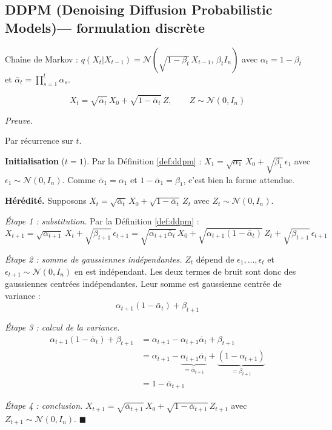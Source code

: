 \documentclass[12pt]{article}
\renewcommand{\qedsymbol}{$\blacksquare$}
\renewenvironment{proof}[1][\proofname]{%
  \par\medskip\noindent
  \textit{\color{proofgray}#1.}\enspace\ignorespaces
}{\hfill\qedsymbol\par\medskip}
\renewcommand{\proofname}{Preuve}
\begin{document}
\subsection{DDPM (Denoising Diffusion Probabilistic Models)--- formulation discrète}

\begin{definitionbox}
\label{def:ddpm}
Chaîne de Markov : $q(X_t | X_{t-1}) = \mathcal{N}(\sqrt{1-\beta_t}\, X_{t-1},\, \beta_t I_n)$ avec $\alpha_t = 1-\beta_t$ et $\bar\alpha_t = \prod_{s=1}^t \alpha_s$.
\end{definitionbox}

\begin{resultbox}
\label{res:ddpm}
\begin{equation}
    \boxed{X_t = \sqrt{\bar\alpha_t}\, X_0 + \sqrt{1-\bar\alpha_t}\, Z, \qquad Z \sim \mathcal{N}(0, I_n)}
    \label{eq:ddpm_marginal}
\end{equation}
\end{resultbox}

  \begin{proof}







Par récurrence sur $t$.

\textbf{Initialisation} ($t=1$). Par la Définition \ref{def:ddpm} : $X_1 = \sqrt{\alpha_1}\, X_0 + \sqrt{\beta_1}\, \epsilon_1$ avec $\epsilon_1 \sim \mathcal{N}(0, I_n)$. Comme $\bar\alpha_1 = \alpha_1$ et $1 - \bar\alpha_1 = \beta_1$, c'est bien la forme attendue.

\textbf{Hérédité.} Supposons $X_t = \sqrt{\bar\alpha_t}\, X_0 + \sqrt{1-\bar\alpha_t}\, Z_t$ avec $Z_t \sim \mathcal{N}(0, I_n)$.

\textit{Étape 1 : substitution.} Par la Définition \ref{def:ddpm} :
\[
X_{t+1} = \sqrt{\alpha_{t+1}}\, X_t + \sqrt{\beta_{t+1}}\, \epsilon_{t+1} = \sqrt{\alpha_{t+1}\bar\alpha_t}\, X_0 + \sqrt{\alpha_{t+1}(1-\bar\alpha_t)}\, Z_t + \sqrt{\beta_{t+1}}\, \epsilon_{t+1}
\]

\textit{Étape 2 : somme de gaussiennes indépendantes.} $Z_t$ dépend de $\epsilon_1, \ldots, \epsilon_t$ et $\epsilon_{t+1} \sim \mathcal{N}(0, I_n)$ en est indépendant. Les deux termes de bruit sont donc des gaussiennes centrées indépendantes. Leur somme est gaussienne centrée de variance :
\[
\alpha_{t+1}(1-\bar\alpha_t) + \beta_{t+1}
\]

\textit{Étape 3 : calcul de la variance.}
\begin{align}
    \alpha_{t+1}(1-\bar\alpha_t) + \beta_{t+1} &= \alpha_{t+1} - \alpha_{t+1}\bar\alpha_t + \beta_{t+1} \nonumber\\
    &= \alpha_{t+1} - \underbrace{\alpha_{t+1}\bar\alpha_t}_{= \bar\alpha_{t+1}} + \underbrace{(1 - \alpha_{t+1})}_{= \beta_{t+1}} \nonumber\\[-2pt]
    &= 1 - \bar\alpha_{t+1}
\end{align}

\textit{Étape 4 : conclusion.} $X_{t+1} = \sqrt{\bar\alpha_{t+1}}\, X_0 + \sqrt{1 - \bar\alpha_{t+1}}\, Z_{t+1}$ avec $Z_{t+1} \sim \mathcal{N}(0, I_n)$.
\end{proof}
\end{document}
